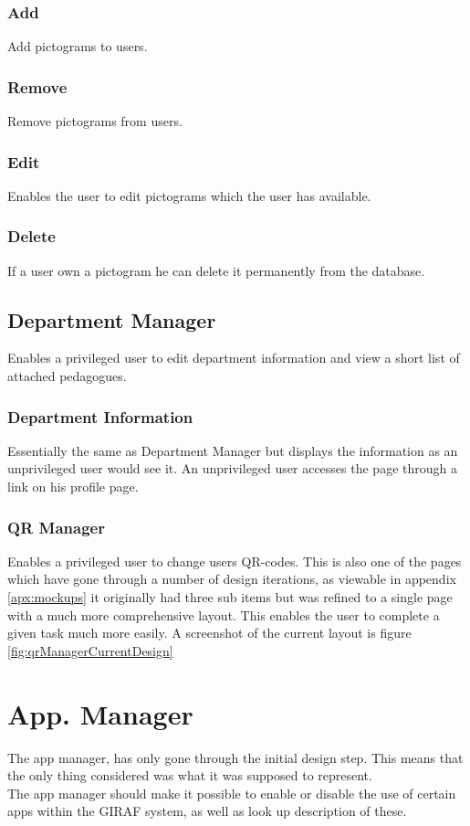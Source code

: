 \subsubsection*{Add}
Add pictograms to users.
\subsubsection*{Remove}
Remove pictograms from users.
\subsubsection*{Edit}
Enables the user to edit pictograms which the user has available.
\subsubsection*{Delete}
If a user own a pictogram he can delete it permanently from the database.

\subsection{Department Manager}
Enables a privileged user to edit department information and view a short list of attached pedagogues.
\subsubsection*{Department Information}
Essentially the same as Department Manager but displays the information as an unprivileged user would see it. An unprivileged user accesses the page through a link on his profile page.
\subsubsection*{QR Manager}
Enables a privileged user to change users QR-codes. This is also one of the pages which have gone through a number of design iterations, as viewable in appendix \ref{apx:mockups} it originally had three sub items but was refined to a single page with a much more comprehensive layout. This enables the user to complete a given task much more easily. A screenshot of the current layout is figure \ref{fig:qrManagerCurrentDesign}

\section{App. Manager}
The app manager, has only gone through the initial design step. This means that the only thing considered was what it was supposed to represent.\\
The app manager should make it possible to enable or disable the use of certain apps within the GIRAF system, as well as look up description of these.

